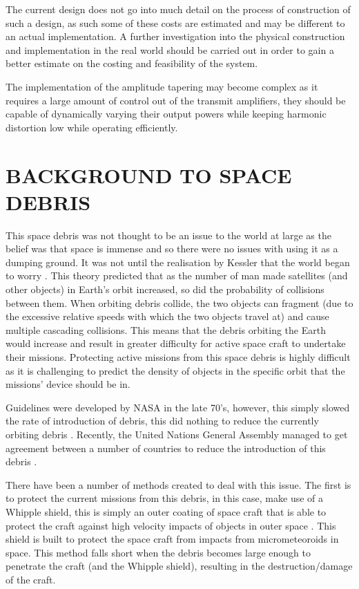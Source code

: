 \documentclass[11pt]{witseiepaper}
\begin{document}
\begin{bibunit}[witseie]
The current design does not go into much detail on the process of construction of such a design, as such some of these costs are estimated and may be different to an actual implementation. A further investigation into the physical construction and implementation in the real world should be carried out in order to gain a better estimate on the costing and feasibility of the system.

The implementation of the amplitude tapering may become complex as it requires a large amount of control out of the transmit amplifiers, they should be capable of dynamically varying their output powers while keeping harmonic distortion low while operating efficiently.


\section{BACKGROUND TO SPACE DEBRIS} \label{sec:BackgroundToSpaceDebris}

This space debris was not thought to be an issue to the world at large as the belief was that space is immense and so there were no issues with using it as a dumping ground. It was not until the realisation by Kessler that the world began to worry \cite{Kessler}. This theory predicted that as the number of man made satellites (and other objects) in Earth's orbit increased, so did the probability of collisions between them. When orbiting debris collide, the two objects can fragment (due to the excessive relative speeds with which the two objects travel at) and cause multiple cascading collisions. This means that the debris orbiting the Earth would increase and result in greater difficulty for active space craft to undertake their missions.
Protecting active missions from this space debris is highly difficult as it is challenging to predict the density of objects in the specific orbit that the missions' device should be in.

Guidelines were developed by NASA in the late 70's, however, this simply slowed the rate of introduction of debris, this did nothing to reduce the currently orbiting debris \cite{spaceDebrisGuide}. Recently, the United Nations General Assembly managed to get agreement between a number of countries to reduce the introduction of this debris \cite{debrisGuidelinesAgreement}.

There have been a number of methods created to deal with this issue. The first is to protect the current missions from this debris, in this case, make use of a Whipple shield, this is simply an outer coating of space craft that is able to protect the craft against high velocity impacts of objects in outer space \cite{Whipple}. This shield is built to protect the space craft from impacts from micrometeoroids in space.
This method falls short when the debris becomes large enough to penetrate the craft (and the Whipple shield), resulting in the destruction/damage of the craft.


\end{bibunit}
\end{document}
